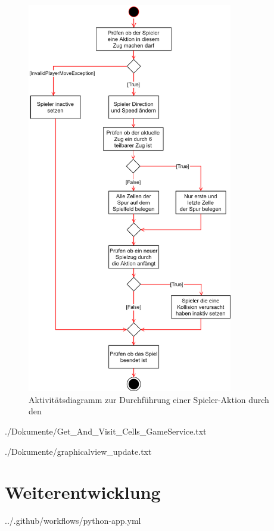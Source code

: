 \begin{figure}[htb]
	\centering
	\includegraphics[width=0.8\textwidth]{Bilder/game_service_do_action_activity_diagram.png}
	\caption{Aktivitätsdiagramm zur Durchführung einer Spieler-Aktion durch den }
	\label{fig:aktivitaetsdiagramm-spieleraktion-gameservice}
\end{figure}

\begin{minipage}{\textwidth}
	
	{./Dokumente/Get_And_Visit_Cells_GameService.txt}
\end{minipage}

\begin{minipage}{\textwidth}
	
	{./Dokumente/graphicalview_update.txt}
\end{minipage}

\section{Weiterentwicklung}
\label{sec:anhang-weiterentwicklung}

\begin{minipage}{\textwidth}
	
	{../.github/workflows/python-app.yml}
\end{minipage}
